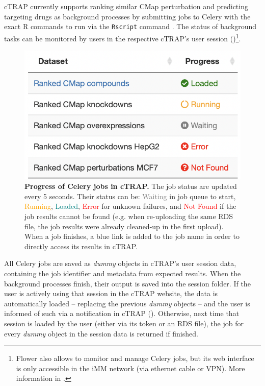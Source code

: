 cTRAP currently supports ranking similar CMap perturbation and predicting targeting drugs as background processes by submitting jobs to Celery with the exact R commands to run via the \texttt{Rscript} command \cite{r-core-team:2021wf}. The status of background tasks can be monitored by users in the respective cTRAP's user session ()\footnote{Flower also allows to monitor and manage Celery jobs, but its web interface is only accessible in the iMM network (via ethernet cable or VPN). More information in .}.

\begin{figure}[!h]
  \includegraphics[width=.5\textwidth]{images/ctrap/job-progress}
  \centering
  \caption[Progress of Celery jobs in cTRAP]{\textbf{Progress of Celery jobs in cTRAP.} The job status are updated every 5 seconds. Their status can be: \textcolor{gray}{Waiting} in job queue to start, \textcolor{orange}{Running}, \textcolor{teal}{Loaded}, \textcolor{red}{Error} for unknown failures, and \textcolor{red}{Not Found} if the job results cannot be found (e.g. when re-uploading the same RDS file, the job results were already cleaned-up in the first upload). When a job finishes, a blue link is added to the job name in order to directly access its results in cTRAP.}
  \label{fig:job-progress}
\end{figure}

All Celery jobs are saved as \emph{dummy} objects in cTRAP's user session data, containing the job identifier and metadata from expected results. When the background processes finish, their output is saved into the session folder. If the user is actively using that session in the cTRAP website, the data is automatically loaded -- replacing the previous \emph{dummy} objects -- and the user is informed of such via a notification in cTRAP (). Otherwise, next time that session is loaded by the user (either via its token or an RDS file), the job for every \emph{dummy} object in the session data is returned if finished.

